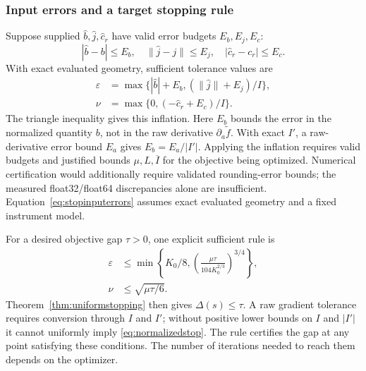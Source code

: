 \documentclass[pdflatex,sn-mathphys-num]{sn-jnl}
\begin{document}
\subsubsection{Input errors and a target stopping rule}
Suppose supplied $\widehat b,\widehat j,\widehat c_r$ have valid error budgets $E_b,E_j,E_c$:
\begin{equation}
 |\widehat b-b|\le E_b,\quad\|\widehat j-j\|\le E_j,
 \quad|\widehat c_r-c_r|\le E_c.
 \label{eq:stopinputerrors}
\end{equation}
With exact evaluated geometry, sufficient tolerance values are
\begin{equation}
 \begin{aligned}
 \varepsilon&=\max\{ |\widehat b|+E_b,
                         (\|\widehat j\|+E_j)/I\},\\
 \nu&=\max\{0,(-\widehat c_r+E_c)/I\}.
 \end{aligned}
 \label{eq:stopinflation}
\end{equation}
The triangle inequality gives this inflation. Here $E_b$ bounds the error in the normalized quantity $b$, not in the raw derivative $\partial_a\widetilde f$. With exact $I'$, a raw-derivative error bound $E_a$ gives $E_b=E_a/|I'|$. Applying the inflation requires valid budgets and justified bounds $\mu,L,\overline I$ for the objective being optimized. Numerical certification would additionally require validated rounding-error bounds; the measured float32/float64 discrepancies alone are insufficient. Equation~\eqref{eq:stopinputerrors} assumes exact evaluated geometry and a fixed instrument model.

For a desired objective gap $\tau>0$, one explicit sufficient rule is
\begin{equation}
 \begin{aligned}
 \varepsilon&\le\min\!\left\{K_0/8,
            \left(\frac{\mu\tau}{104K_0^{2/3}}\right)^{3/4}\right\},\\
 \nu&\le\sqrt{\mu\tau/6}.
 \end{aligned}
 \label{eq:targetstop}
\end{equation}
Theorem~\ref{thm:uniformstopping} then gives $\Delta(s)\le\tau$. A raw gradient tolerance requires conversion through $I$ and $I'$; without positive lower bounds on $I$ and $|I'|$ it cannot uniformly imply \eqref{eq:normalizedstop}. The rule certifies the gap at any point satisfying these conditions. The number of iterations needed to reach them depends on the optimizer.
\end{document}
